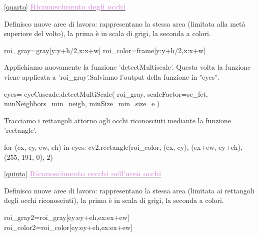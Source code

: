 \documentclass[12pt]{article}
\begin{document}
{\ref {quarto} \underline{\textbf{\textcolor{Plum}{Riconoscimento degli occhi}}}

\vspace{1cm}

Definisco nuove aree di lavoro: rappresentano la stessa area (limitata alla metà superiore del volto), la prima è in scala di grigi, la seconda a colori.

\vspace{1cm}


 \begin{codice}
            roi_gray=gray[y:y+h/2,x:x+w]
            roi_color=frame[y:y+h/2,x:x+w]

\end{codice}

\vspace{1cm}


Applichiamo nuovamente la funzione 'detectMultiscale'. Questa volta la funzione viene applicata a 'roi\_gray'.Salviamo l'output della funzione in "eyes".
\vspace{1cm}
 
 \begin{codice}
             eyes= eyeCascade.detectMultiScale(         
                 roi_gray,
                 scaleFactor=sc_fct,
                 minNeighbors=min_neigh,
                 minSize=min_size_e
                 )  
 \end{codice}
\vspace{1cm}

Tracciamo i rettangoli attorno agli occhi riconosciuti mediante la funzione 'rectangle'.
\vspace{1cm}
 
 \begin{codice}
            for (ex, ey, ew, eh) in eyes:
                cv2.rectangle(roi_color, (ex, ey), (ex+ew, ey+eh), (255, 191, 0), 2)
\end{codice}

\vspace{2cm}
  	 	
 \ref {quinto} \underline{\textbf{\textcolor{Plum}{Riconoscimento cerchi nell'area occhi}}}
 
 \vspace{1cm} 	
 
 
 Definisco nuove aree di lavoro: rappresentano la stessa area (limitata ai rettangoli degli occhi riconosciuti), la prima è in scala di grigi, la seconda a colori.
 \vspace{1cm}
 \begin{codice}
                roi_gray2=roi_gray[ey:ey+eh,ex:ex+ew]
                roi_color2=roi_color[ey:ey+eh,ex:ex+ew]


\end{codice}}
\end{document}
